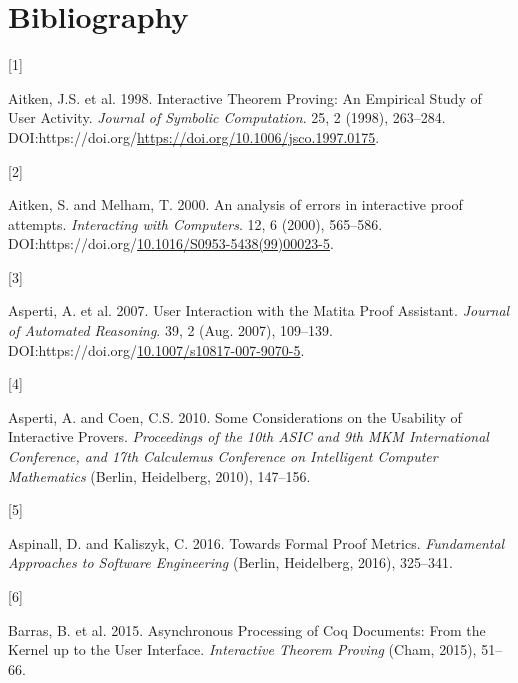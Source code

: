 \documentclass[
]{article}
\newlength{\cslhangindent}
\newlength{\csllabelwidth}
\newlength{\cslentryspacingunit} %
\newenvironment{CSLReferences}[2] %
 {%
  \setlength{\parindent}{0pt}
  \ifodd #1
  \let\oldpar\par
  \def\par{\hangindent=\cslhangindent\oldpar}
  \fi
  \setlength{\parskip}{#2\cslentryspacingunit}
 }%
 {}
\newcommand{\CSLLeftMargin}[1]{\parbox[t]{\csllabelwidth}{#1}}
\newcommand{\CSLRightInline}[1]{\parbox[t]{\linewidth - \csllabelwidth}{#1}\break}
\begin{document}
\hypertarget{bibliography}{%
\section*{Bibliography}\label{bibliography}}

\hypertarget{refs}{}
\begin{CSLReferences}{0}{0}
\leavevmode{}%
\CSLLeftMargin{{[}1{]} }
\CSLRightInline{Aitken, J.S. et al. 1998. Interactive {Theorem}
{Proving}: {An} {Empirical} {Study} of {User} {Activity}. \emph{Journal
of Symbolic Computation}. 25, 2 (1998), 263--284.
DOI:https://doi.org/\url{https://doi.org/10.1006/jsco.1997.0175}.}

\leavevmode{}%
\CSLLeftMargin{{[}2{]} }
\CSLRightInline{Aitken, S. and Melham, T. 2000. An analysis of errors in
interactive proof attempts. \emph{Interacting with Computers}. 12, 6
(2000), 565--586.
DOI:https://doi.org/\href{https://doi.org/10.1016/S0953-5438(99)00023-5}{10.1016/S0953-5438(99)00023-5}.}

\leavevmode{}%
\CSLLeftMargin{{[}3{]} }
\CSLRightInline{Asperti, A. et al. 2007. User {Interaction} with the
{Matita} {Proof} {Assistant}. \emph{Journal of Automated Reasoning}. 39,
2 (Aug. 2007), 109--139.
DOI:https://doi.org/\href{https://doi.org/10.1007/s10817-007-9070-5}{10.1007/s10817-007-9070-5}.}

\leavevmode{}%
\CSLLeftMargin{{[}4{]} }
\CSLRightInline{Asperti, A. and Coen, C.S. 2010. Some {Considerations}
on the {Usability} of {Interactive} {Provers}. \emph{Proceedings of the
10th {ASIC} and 9th {MKM} {International} {Conference}, and 17th
{Calculemus} {Conference} on {Intelligent} {Computer} {Mathematics}}
(Berlin, Heidelberg, 2010), 147--156.}

\leavevmode{}%
\CSLLeftMargin{{[}5{]} }
\CSLRightInline{Aspinall, D. and Kaliszyk, C. 2016. Towards {Formal}
{Proof} {Metrics}. \emph{Fundamental {Approaches} to {Software}
{Engineering}} (Berlin, Heidelberg, 2016), 325--341.}

\leavevmode{}%
\CSLLeftMargin{{[}6{]} }
\CSLRightInline{Barras, B. et al. 2015. Asynchronous {Processing} of
{Coq} {Documents}: {From} the {Kernel} up to the {User} {Interface}.
\emph{Interactive {Theorem} {Proving}} (Cham, 2015), 51--66.}


\end{CSLReferences}
\end{document}
